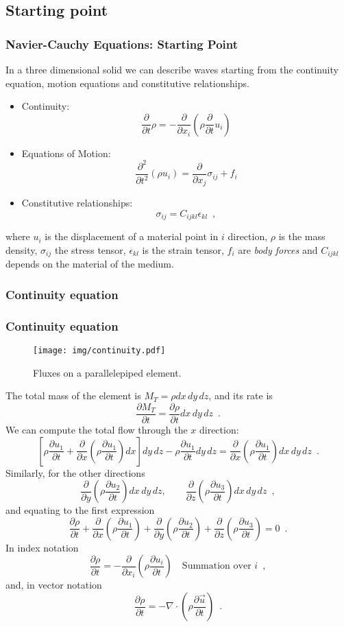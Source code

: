 \documentclass{beamer}
\newcommand{\pardiff}[2]{\frac{\partial #1}{\partial #2}}
\begin{document}
\subsection{Starting point}
\begin{frame}\frametitle{Navier-Cauchy Equations: Starting Point}
In a three dimensional solid we can describe waves starting from the continuity equation, motion equations and constitutive relationships.
\begin{itemize}
\item Continuity:
\[\frac{\partial}{\partial t}\rho = - \frac{\partial}{\partial x_i}\left( \rho \frac{\partial}{\partial t} u_i\right)\]

\item Equations of Motion:
\[ \frac{\partial^2}{\partial t^2}(\rho u_i) = \frac{\partial}{\partial x_j} \sigma_{ij} + f_i \]

\item Constitutive relationships:
\[\sigma_{ij} = C_{ijkl} \epsilon_{kl}  \enspace ,\]

\end{itemize}
where $u_i$ is the displacement of a material point in $i$ direction, $\rho$ is the mass density, $\sigma_{ij}$ the stress tensor, $\epsilon_{kl}$ is the strain tensor, $f_i$ are \emph{body forces} and $C_{ijkl}$ depends on the material of the medium.
\end{frame}

\subsubsection{Continuity equation}
\begin{frame}[allowframebreaks]\frametitle{Continuity equation}
\begin{figure}[h]
	\centering
	\texttt{[image: img/continuity.pdf]}
	\caption{Fluxes on a parallelepiped element.}
\end{figure}
The total mass of the element is $M_T = \rho dx\, dy\, dz$, and its rate is
\[\pardiff{M_T}{t} = \pardiff{\rho}{t} dx\, dy\, dz \enspace .\]
We can compute the total flow through the $x$ direction:
\[\left[ \rho \pardiff{u_1}{t} + \pardiff{}{x}\left(\rho \pardiff{u_1}{t}\right) dx\right] dy\, dz - \rho \pardiff{u_1}{t} dy\, dz = \pardiff{}{x}\left(\rho \pardiff{u_1}{t}\right)dx\, dy\, dz \enspace .\]
Similarly, for the other directions
\[\pardiff{}{y}\left(\rho \pardiff{u_2}{t}\right)dx\, dy\, dz,\qquad \pardiff{}{z}\left(\rho \pardiff{u_3}{t}\right)dx\, dy\, dz \enspace ,\]
and equating to the first expression
\[\pardiff{\rho}{t} + \pardiff{}{x}\left(\rho \pardiff{u_1}{t}\right) + \pardiff{}{y}\left(\rho \pardiff{u_2}{t}\right) + \pardiff{}{z}\left(\rho \pardiff{u_3}{t}\right) = 0\enspace .\]
In index notation
\[\pardiff{\rho}{t} = - \pardiff{}{x_i}\left(\rho \pardiff{u_i}{t}\right) \quad \text{Summation over } i \enspace ,\]
and, in vector notation
\[\pardiff{\rho}{t} = - \nabla \cdot \left(\rho \pardiff{\vec{u}}{t}\right) \enspace.\]
\end{frame}
\end{document}
